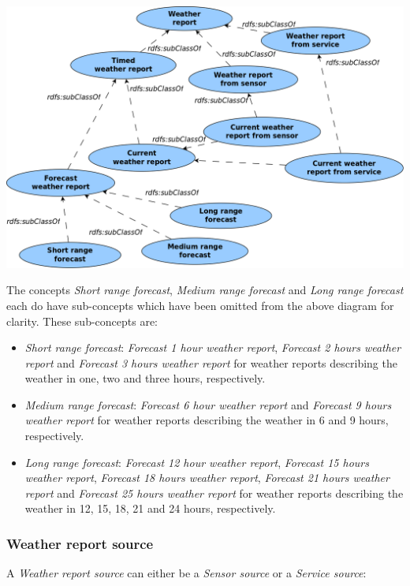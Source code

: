 \begin{center}
  \includegraphics[width=\textwidth]{figures/diagrams/weather-report.png}
\end{center}

The concepts \emph{Short range forecast}, \emph{Medium range forecast} and \emph{Long range forecast} each do have sub-concepts which have been omitted from the above diagram for clarity. These sub-concepts are:
\begin{itemize}
  \item \emph{Short range forecast}: \emph{Forecast 1 hour weather report}, \emph{Forecast 2 hours weather report} and \emph{Forecast 3 hours weather report} for weather reports describing the weather in one, two and three hours, respectively.
  \item \emph{Medium range forecast}: \emph{Forecast 6 hour weather report} and \emph{Forecast 9 hours weather report} for weather reports describing the weather in 6 and 9 hours, respectively.
  \item \emph{Long range forecast}: \emph{Forecast 12 hour weather report}, \emph{Forecast 15 hours weather report}, \emph{Forecast 18 hours weather report}, \emph{Forecast 21 hours weather report} and \emph{Forecast 25 hours weather report} for weather reports describing the weather in 12, 15, 18, 21 and 24 hours, respectively.
\end{itemize}

\subsubsection{Weather report source}

A \emph{Weather report source} can either be a \emph{Sensor source} or a \emph{Service source}:

